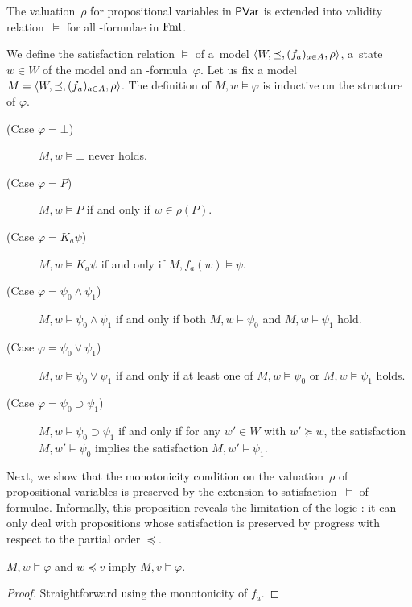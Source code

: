        The valuation~$\rho$ for propositional variables in $\mathsf{PVar}$ is extended into validity
       relation~$\models$ for all \iec-formulae in $\mathsf{\operatorname{Fml}}$.
       \begin{definition}
	We define the satisfaction relation $\models$ of a~model
	$\langle{W,\preceq,(f_a)_{a\in A},\rho}\rangle$, a~state~$w\in W$ of the model and an
	\iec-formula~$\varphi$.
	Let us fix a model $M=\langle{W,\preceq,(f_a)_{a\in A},\rho}\rangle$.
	\newcommand{\m}{M}
	The definition of $M,w\models\varphi$ is inductive on the structure of $\varphi$.
	\begin{description}
	 \item[(Case $\varphi=\bot$)] $\m, w\models \bot$ never holds.
	 \item[(Case $\varphi= P$)] $\m, w\models P$ if and only if
	      $w \in
	      \rho(P)$.
	 \item[(Case $\varphi = K_a \psi$)]
	      $\m, w\models K_a \psi$ if and only if
	      $\m, f_a(w)\models \psi$.
	 \item[(Case $\varphi = \psi_0\land\psi_1$)]
	      $\m, w\models \psi_0\land\psi_1$ if and only if both
	      $\m, w\models \psi_0$ and $\m,w\models \psi_1$ hold.
	 \item[(Case $\varphi = \psi_0\vee\psi_1$)]
	      $\m, w\models \psi_0\vee\psi_1$ if and only if at least
	      one of
	      $\m, w\models \psi_0$ or $\m,w\models \psi_1$ holds.
	 \item[(Case $\varphi = \psi_0\supset \psi_1$)]
	      $\m, w\models \psi_0\supset\psi_1$ if and only if
	      for any $w'\in W$ with $w'\succeq w$, the satisfaction $M,w'\models \psi_0$ implies
	      the satisfaction $M, w'\models
	      \psi_1$.
	\end{description}
       \end{definition}

       Next, we show that the monotonicity condition on the valuation~$\rho$ of
       propositional variables is preserved by the extension
       to satisfaction~$\models$ of \iec-formulae. Informally, this
       proposition
       reveals the limitation of the logic \iec:
       it can only deal with propositions whose satisfaction is preserved by progress with respect to
       the partial order $\preceq$.
       \begin{proposition}
	\label{kripke}
	$M,w\models \varphi$ and $w\preceq v$ imply
	$M,v\models \varphi$.
       \end{proposition}
       \begin{proof}
	Straightforward using the monotonicity of $f_a$.
       \end{proof}

